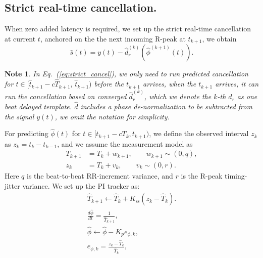 \documentclass[conference]{IEEEtran}
\newtheorem{noteenv}{Note}
\begin{document}
\subsection{Strict real-time cancellation.}
\label{sec:strict_real_time}
When zero added latency is required, we set up the strict real-time cancellation at current $t$, anchored 
on the the next incoming R-peak at $t_{k+1}$, we obtain
\begin{equation}
\hat{s}(t) = y(t) - \hat{d}^{(k)}_r\!\left(\hat{\phi}^{(k+1)}(t)\right).
\label{eq:strict_cancel}
\end{equation}
\begin{noteenv}
  In Eq.~(\ref{eq:strict_cancel}), we only need to run predicted cancellation for $t\in[\hat{t}_{k+1}-c\hat{T}_{k+1},\,\hat{t}_{k+1})$
  before the $t_{k+1}$ arrives, when the $t_{k+1}$ arrives, it can run the cancellation
  based on converged $\hat{d}^{(k)}_r$, which we denote the $k$-th $\hat{d}_r$ as one beat delayed template. $\hat{d}$ includes a phase de-normalization
  to be subtracted from the signal $y(t)$, we omit the notation for simplicity.

\end{noteenv}
For predicting $\hat{\phi}(t)$ for $t \in[t_{k+1} - cT_k,t_{k+1})$, we define
the observed interval $z_{k}$ as $z_{k}=t_{k}-t_{k-1}$, and we assume the measurement model as
\begin{subequations}\label{eq:rr_model}
\begin{align}
T_{k+1} &= T_{k}+w_{k+1}, \qquad w_{k+1}\sim(0,q),
\label{eq:rr_state}\\
z_{k} &= T_{k}+v_{k}, \qquad v_{k}\sim(0,r).
\label{eq:rr_measurement}
\end{align}
\end{subequations}
Here $q$ is the beat-to-beat RR-increment variance, and
$r$ is the R-peak timing-jitter variance. We set up the PI tracker as:
\begin{subequations}\label{eq:pi_tracker}
\begin{align}
  \hat{T}_{k+1}\leftarrow\hat{T}_{k}+K_{\mathrm{ss}}\left(z_{k}-\hat{T}_{k}\right).
\label{eq:pi_rate}\\
\frac{d\hat\phi}{dt}=\frac{1}{\hat{T}_{k+1}},
\label{eq:pi_phase_advance}\\
\hat\phi\leftarrow\hat\phi-K_p e_{\phi,k},
\label{eq:pi_onset}\\
e_{\phi,k}=\frac{z_{k}-\hat{T}_{k}}{\hat{T}_{k}},
\label{eq:pi_phase_error}
\end{align}
\end{subequations}
\end{document}
